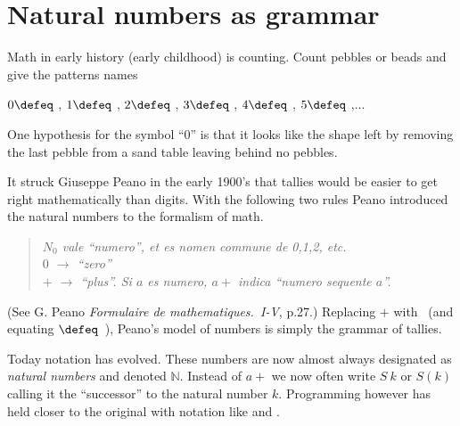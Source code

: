 \chapter{Natural numbers as grammar}
Math in early history (early childhood) is counting.  Count 
pebbles or beads and give the patterns names
\begin{center}
    $0\defeq$ \underline{\hspace{5mm}}, 
    $1\defeq$ \StrokeOne,
    $2\defeq$ \StrokeTwo,
    $3\defeq$ \StrokeThree,
    $4\defeq$ \StrokeFour,
    $5\defeq$ \StrokeFive,...
\end{center}
One hypothesis for the symbol
``0'' is that it looks like the shape left by removing the last pebble from
a sand table leaving behind no pebbles.

It struck Giuseppe Peano in the early 1900's that tallies would be easier to get
right mathematically than digits. With the following two rules Peano introduced
the natural numbers to the formalism of math.
\begin{quote}
    \textit{
    $N_0$ vale ``numero'', et es nomen commune de 0,1,2, etc.\\
    $0$ $\to$  ``zero''\\
    $+$ $\to$ ``plus''.  Si $a$ es numero, $a+$ indica ``numero sequente $a$''.
    }
\end{quote}
(See G. Peano \emph{Formulaire de mathematiques.~I-V}, p.27.)
Replacing $+$ with \StrokeOne ~(and equating \StrokeFive$\defeq$\StrokeFour~\StrokeOne),
Peano's model of numbers is simply the grammar of tallies.

Today notation has evolved.  These numbers are now almost always designated as
\emph{natural numbers} and denoted $\mathbb{N}$.  Instead of $a+$ we now often
write $S~k$  or $S(k)$ calling it the ``successor'' to the natural number $k$.  
Programming however has held closer to the original with notation like 
 and .

